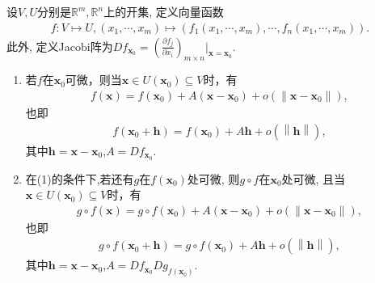\documentclass[../../main.tex]{subfiles}%
\begin{document}
\begin{theorem}\label{theorem:多元函数可微的导数与偏导的关系}
设$V, U$分别是$\mathbb{R}^m, \mathbb{R}^n$上的开集, 定义向量函数
\begin{align*}
f: V \mapsto U, (x_1, \cdots, x_m) \mapsto (f_1(x_1, \cdots, x_m), \cdots, f_n(x_1, \cdots, x_m)).
\end{align*}
此外, 定义Jacobi阵为$Df_{\bm{x}_0} = \left(\frac{\partial f_j}{\partial x_i}\right)_{m \times n}\Big|_{\bm{x}=\bm{x}_0}$.
\begin{enumerate}[(1)]
\item 若$f$在$\bm{x}_0$可微，则当$\bm{x} \in U(\bm{x}_0) \subseteq V$时，有
\begin{align*}
f(\bm{x}) = f(\bm{x}_0) + A(\bm{x} - \bm{x}_0) + o\left( \|\bm{x} - \bm{x}_0\| \right),
\end{align*}
也即
\begin{align*}
f\left( \boldsymbol{x}_0+\boldsymbol{h} \right) =f\left( \bm{x}_0 \right) +A\boldsymbol{h}+o\left( \left\| \boldsymbol{h} \right\| \right) ,
\end{align*}
其中$\boldsymbol{h}=\boldsymbol{x}-\boldsymbol{x}_0$,$A= Df_{\bm{x}_0}$.

\item 在(1)的条件下,若还有$g$在$f(\bm{x}_0)$处可微, 则$g \circ f$在$\bm{x}_0$处可微, 且当$\bm{x} \in U(\bm{x}_0) \subseteq V$时，有
\begin{align*}
g\circ f(\boldsymbol{x})=g\circ f(\boldsymbol{x}_0)+A(\boldsymbol{x}-\boldsymbol{x}_0)+o\left( \parallel \boldsymbol{x}-\boldsymbol{x}_0\parallel \right) ,
\end{align*}
也即
\begin{align*}
g\circ f\left( \boldsymbol{x}_0+\boldsymbol{h} \right) =g\circ f\left( \boldsymbol{x}_0 \right) +A\boldsymbol{h}+o\left( \left\| \boldsymbol{h} \right\| \right) ,
\end{align*}
其中$\boldsymbol{h}=\boldsymbol{x}-\boldsymbol{x}_0$,$A = Df_{\bm{x}_0} Dg_{f(\bm{x}_0)}$.
\end{enumerate}
\end{theorem}
\end{document}
